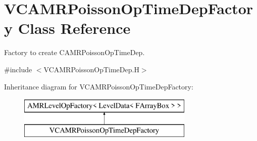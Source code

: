 \hypertarget{class_v_c_a_m_r_poisson_op_time_dep_factory}{\section{V\-C\-A\-M\-R\-Poisson\-Op\-Time\-Dep\-Factory Class Reference}
\label{class_v_c_a_m_r_poisson_op_time_dep_factory}
}


Factory to create C\-A\-M\-R\-Poisson\-Op\-Time\-Dep.  




{\ttfamily \#include $<$V\-C\-A\-M\-R\-Poisson\-Op\-Time\-Dep.\-H$>$}

Inheritance diagram for V\-C\-A\-M\-R\-Poisson\-Op\-Time\-Dep\-Factory\-:\begin{figure}[H]
\begin{center}
\leavevmode
\includegraphics[height=2.000000cm]{class_v_c_a_m_r_poisson_op_time_dep_factory}
\end{center}
\end{figure}
